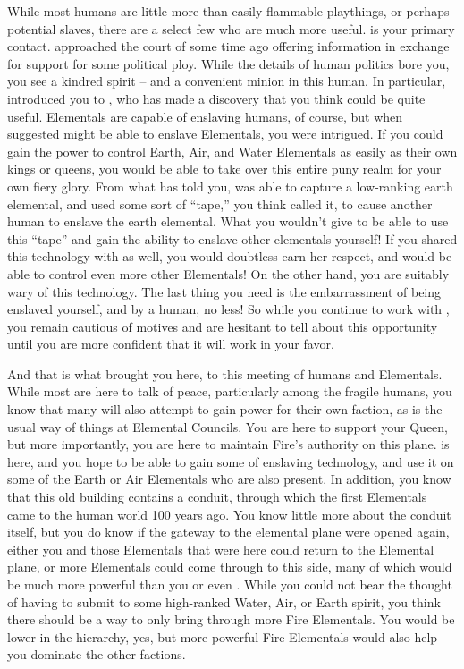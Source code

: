 \documentclass[char]{elementals}
\begin{document}
While most humans are little more than easily flammable playthings, or perhaps potential slaves, there are a select few who are much more useful.  \cDema{\full} is your primary contact.  \cDema{\They} approached the court of \cQueen{} some time ago offering information in exchange for support for some political ploy.  While the details of human politics bore you, you see a kindred spirit -- and a convenient minion in this human.  In particular, \cDema{\full} introduced you to \cMS{\intro}, who has made a discovery that you think could be quite useful.  Elementals are capable of enslaving humans, of course, but when \cMS{} suggested  might be able to enslave Elementals, you were intrigued.  If you could gain the power to control Earth, Air, and Water Elementals as easily as their own kings or queens, you would be able to take over this entire puny realm for your own fiery glory.  From what \cMS{} has told you, \cMS{\they} was able to capture a low-ranking earth elemental, and used some sort of ``tape,'' you think \cMS{\they} called it, to cause another human to enslave the earth elemental.  What you wouldn't give to be able to use this ``tape'' and gain the ability to enslave other elementals yourself!  If you shared this technology with \cQueen{} as well, you would doubtless earn her respect, and \cQueen{\they} would be able to control even more other Elementals!  On the other hand, you are suitably wary of this technology.  The last thing you need is the embarrassment of being enslaved yourself, and by a human, no less!  So while you continue to work with \cMS{}, you remain cautious of \cMS{\their} motives and are hesitant to tell \cQueen{} about this opportunity until you are more confident that it will work in your favor.  

And that is what brought you here, to this meeting of humans and Elementals.  While most are here to talk of peace, particularly among the fragile humans, you know that many will also attempt to gain power for their own faction, as is the usual way of things at Elemental Councils.  You are here to support your Queen, but more importantly, you are here to maintain Fire's authority on this plane.  \cMS{} is here, and you hope to be able to gain some of \cMS{\their} enslaving technology, and use it on some of the Earth or Air Elementals who are also present.  In addition, you know that this old building contains a conduit, through which the first Elementals came to the human world 100 years ago.  You know little more about the conduit itself, but you do know if the gateway to the elemental plane were opened again, either you and those Elementals that were here could return to the Elemental plane, or more Elementals could come through to this side, many of which would be much more powerful than you or even \cQueen{}.  While you could not bear the thought of having to submit to some high-ranked Water, Air, or Earth spirit, you think there should be a way to only bring through more Fire Elementals.  You would be lower in the hierarchy, yes, but more powerful Fire Elementals would also help you dominate the other factions.  
\end{document}
